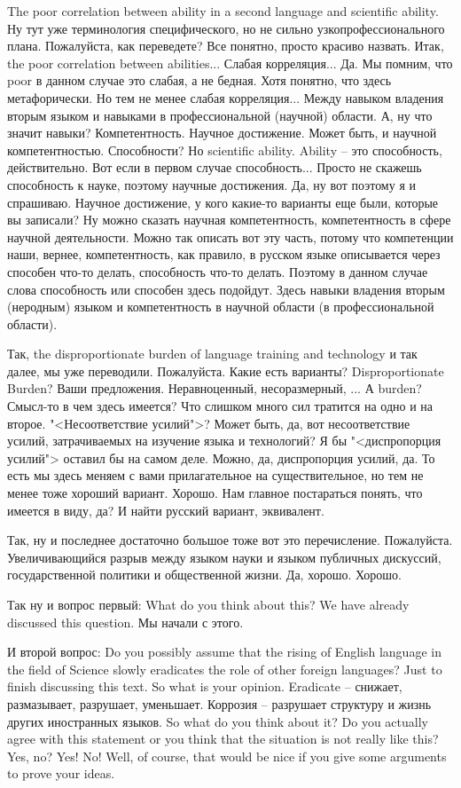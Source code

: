 \documentclass[main.tex]{subfiles}
\begin{document}
The poor correlation between ability in a second language and scientific ability.
Ну тут уже терминология специфического, но не сильно узкопрофессионального плана.
Пожалуйста, как переведете?
Все понятно, просто красиво назвать.
Итак, the poor correlation between abilities...
Слабая корреляция...
Да.
Мы помним, что poor в данном случае это слабая, а не бедная.
Хотя понятно, что здесь метафорически.
Но тем не менее слабая корреляция...
Между навыком владения вторым языком и навыками в профессиональной (научной) области.
А, ну что значит навыки?
Компетентность.
Научное достижение.
Может быть, и научной компетентностью.
Способности?
Но scientific ability.
Ability -- это способность, действительно.
Вот если в первом случае способность...
Просто не скажешь способность к науке, поэтому научные достижения.
Да, ну вот поэтому я и спрашиваю.
Научное достижение, у кого какие-то варианты еще были, которые вы записали?
Ну можно сказать научная компетентность, компетентность в сфере научной деятельности.
Можно так описать вот эту часть, потому что компетенции наши, вернее, компетентность, как правило, в русском языке описывается через способен что-то делать, способность что-то делать.
Поэтому в данном случае слова способность или способен здесь подойдут.
Здесь навыки владения вторым (неродным) языком и компетентность в научной области (в профессиональной области).

Так, the disproportionate burden of language training and technology и так далее, мы уже переводили.
Пожалуйста.
Какие есть варианты?
Disproportionate Burden?
Ваши предложения.
Неравноценный, несоразмерный, ...
А burden?
Смысл-то в чем здесь имеется?
Что слишком много сил тратится на одно и на второе.
"<Несоответствие усилий">?
Может быть, да, вот несоответствие усилий, затрачиваемых на изучение языка и технологий?
Я бы "<диспропорция усилий"> оставил бы на самом деле. 
Можно, да, диспропорция усилий, да.
То есть мы здесь меняем с вами прилагательное на существительное, но тем не менее тоже хороший вариант.
Хорошо.
Нам главное постараться понять, что имеется в виду, да?
И найти русский вариант, эквивалент.

Так, ну и последнее достаточно большое тоже вот это перечисление.
Пожалуйста.
Увеличивающийся разрыв между языком науки и языком публичных дискуссий, государственной политики и общественной жизни.
Да, хорошо.
Хорошо.

Так ну и вопрос первый: What do you think about this?
We have already discussed this question.
Мы начали с этого.

И второй вопрос: Do you possibly assume that the rising of English language in the field of Science slowly eradicates the role of other foreign languages?
Just to finish discussing this text.
So what is your opinion.
Eradicate -- снижает, размазывает, разрушает, уменьшает.
Коррозия -- разрушает структуру и жизнь других иностранных языков.
So what do you think about it?
Do you actually agree with this statement or you think that the situation is not really like this?
Yes, no?
Yes!
No!
Well, of course, that would be nice if you give some arguments to prove your ideas.
\end{document}
